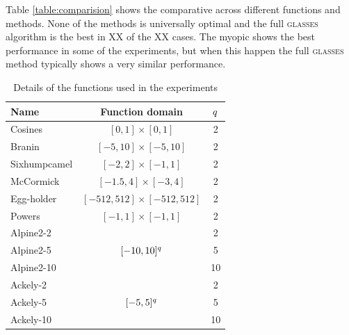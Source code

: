 \documentclass[twoside]{article}
\newcommand{\acr}[1]{\textsc{#1}\xspace}
\newcommand{\us}{\acr{glasses}}
\begin{document}
Table \ref{table:comparision} shows the comparative across different functions and methods. None of the methods is universally optimal and the full \us algorithm is the best in XX of the XX cases. The myopic shows the best performance in some of the experiments, but when this happen the full \us method typically shows a very similar performance. 


\begin{table}[t!]
\begin{center}
\begin{tabular}{lcc}
\toprule
Name &Function domain & $q$ \\
\midrule
\hline
Cosines & $[0,1]\times[0,1]$ & 2\\
Branin &$[-5,10]\times[-5,10]$ & 2\\
 Sixhumpcamel  &$[-2,2]\times[-1,1]$ & 2\\
McCormick  & $[-1.5,4]\times[-3,4]$& 2\\
Egg-holder   &$[-512,512]\times[-512,512]$ & 2\\
Powers  & $[-1,1]\times[-1,1]$& 2\\ %
Alpine2-2  &  & 2\\
Alpine2-5  & $[-10,10]^{q}$& 5\\
Alpine2-10  & & 10\\ %
Ackely-2  & & 2\\
Ackely-5  &$[-5,5]^{q}$ & 5\\
Ackely-10  & & 10\\
\bottomrule
\end{tabular}\caption{Details of the functions used in the experiments}
\end{center}
\end{table}\label{table:test_functions}
\end{document}
